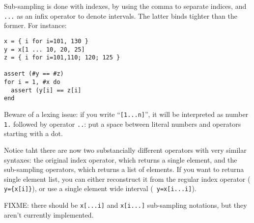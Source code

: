 Sub-sampling is done with indexes, by using the comma to separate
indices, and {\tt...} as an infix operator to denote intervals. The
latter binds tighter than the former. For instance:

\begin{verbatim}
x = { i for i=101, 130 }
y = x[1 ... 10, 20, 25]
z = { i for i=101,110; 120; 125 }

assert (#y == #z)
for i = 1, #x do
  assert (y[i] == z[i]
end
\end{verbatim}

Beware of a lexing issue: if you write ``{\tt[1...n]}'', it will be
interpreted as number {\tt 1.} followed by operator {\tt..}: put a
space between literal numbers and operators starting with a dot.

Notice taht there are now two substancially different operators with
very similar syntaxes: the original index operator, which returns a
single element, and the sub-sampling operators, which returns a list
of elements. If you want to returna single element list, you can
either reconstruct it from the regular index operator ({\tt
  y=\{x[i]\}}), or use a single element wide interval ({\tt
  y=x[i...i]}).

FIXME: there should be \verb|x[...i]| and \verb|x[i...]| sub-sampling
notations, but they aren't currently implemented.